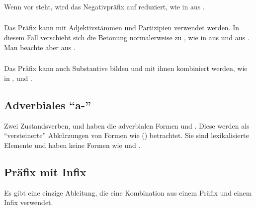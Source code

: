 \subsubsection{} Wenn  vor  steht, wird das Negativpräfix auf  reduziert, wie in   aus  .

\subsubsection{} Das Präfix  kann mit Adjektivstämmen und Partizipien verwendet werden. In diesem Fall verschiebt sich die Betonung normalerweise zu , wie in   aus   und   aus  . Man beachte aber   aus  .\label{lingop:prefix:ke}

\subsubsection{} Das Präfix  kann auch Substantive bilden und mit ihnen kombiniert werden, wie in  , und  . 

\subsection{Adverbiales ``a-''} Zwei Zustandsverben,   und   haben die adverbialen Formen   und  . Diese werden als ``versteinerte'' Abkürzungen von Formen wie  () betrachtet. Sie sind lexikalisierte Elemente und haben keine Formen wie  und .

\subsection{Präfix mit Infix} Es gibt eine einzige Ableitung, die eine Kombination aus einem Präfix und einem Infix verwendet.

